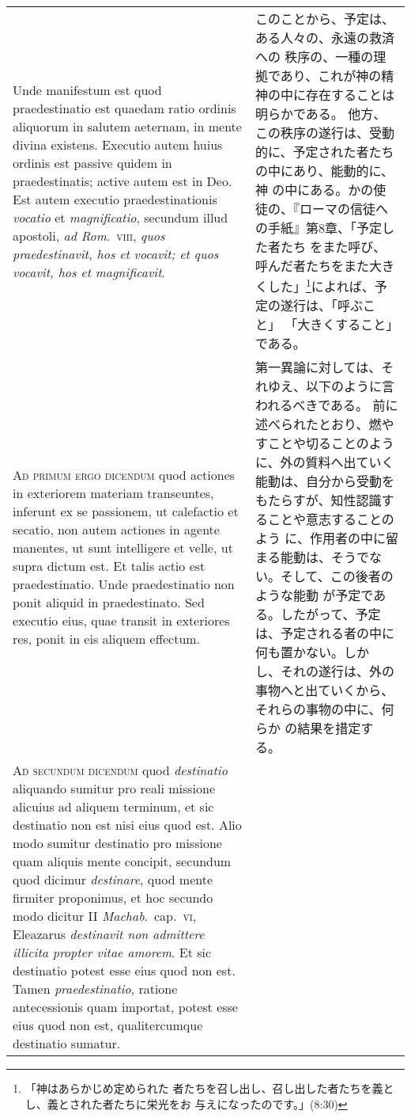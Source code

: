 \documentclass[10pt]{jsarticle} %
\begin{document}
\begin{longtable}{p{21em}p{21em}}
 \\

 Unde
manifestum est quod praedestinatio est quaedam ratio ordinis aliquorum
in salutem aeternam, in mente divina existens. Executio autem huius
ordinis est passive quidem in praedestinatis; active autem est in
Deo. Est autem executio praedestinationis {\itshape vocatio} et {\itshape magnificatio},
secundum illud apostoli, {\itshape ad Rom}.~{\scshape viii}, {\itshape quos praedestinavit, hos et
vocavit; et quos vocavit, hos et magnificavit}.


&

このことから、予定は、ある人々の、永遠の救済への
 秩序の、一種の理拠であり、これが神の精神の中に存在することは明らかである。
 他方、この秩序の遂行は、受動的に、予定された者たちの中にあり、能動的に、神
 の中にある。かの使徒の、『ローマの信徒への手紙』第8章、「予定した者たち
 をまた呼び、呼んだ者たちをまた大きくした」\footnote{「神はあらかじめ定められた
 者たちを召し出し、召し出した者たちを義とし、義とされた者たちに栄光をお
 与えになったのです。」(8:30)}によれば、予定の遂行は、「呼ぶこと」
 「大きくすること」である。
 
\\


{\scshape Ad primum ergo dicendum} quod actiones in
exteriorem materiam transeuntes, inferunt ex se passionem, ut calefactio
et secatio, non autem actiones in agente manentes, ut sunt intelligere
et velle, ut supra dictum est. Et talis actio est praedestinatio. Unde
praedestinatio non ponit aliquid in praedestinato. Sed executio eius,
quae transit in exteriores res, ponit in eis aliquem effectum.


&

 第一異論に対しては、それゆえ、以下のように言われるべきである。
 前に述べられたとおり、燃やすことや切ることのように、外の質料へ出ていく
 能動は、自分から受動をもたらすが、知性認識することや意志することのよう
 に、作用者の中に留まる能動は、そうでない。そして、この後者のような能動
 が予定である。したがって、予定は、予定される者の中に何も置かない。しか
 し、それの遂行は、外の事物へと出ていくから、それらの事物の中に、何らか
 の結果を措定する。

\\


{\scshape Ad secundum dicendum} quod {\itshape destinatio}
aliquando sumitur pro reali missione alicuius ad aliquem terminum, et
sic destinatio non est nisi eius quod est. Alio modo sumitur destinatio
pro missione quam aliquis mente concipit, secundum quod dicimur
{\itshape destinare}, quod mente firmiter proponimus, et hoc secundo modo dicitur
II {\itshape Machab}.~cap.~{\scshape vi}, Eleazarus {\itshape destinavit non admittere illicita propter
vitae amorem}. Et sic destinatio potest esse eius quod non est. Tamen
{\itshape praedestinatio}, ratione antecessionis quam importat, potest esse eius
quod non est, qualitercumque destinatio sumatur.



\end{longtable}
\end{document}
